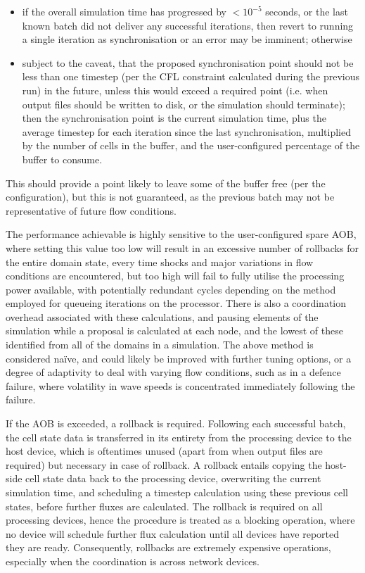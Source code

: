 \begin{itemize}
\item if the overall simulation time has progressed by $< 10^{-5}$ seconds, or the last known batch did not deliver any successful iterations, then revert to running a single iteration as synchronisation or an error may be imminent; otherwise
\item subject to the caveat, that the proposed synchronisation point should not be less than one timestep (per the CFL constraint calculated during the previous run) in the future, unless this would exceed a required point (i.e. when output files should be written to disk, or the simulation should terminate); then the synchronisation point is the current simulation time, plus the average timestep for each iteration since the last synchronisation, multiplied by the number of cells in the buffer, and the user-configured percentage of the buffer to consume.
\end{itemize}
This should provide a point likely to leave some of the buffer free (per the configuration), but this is not guaranteed, as the previous batch may not be representative of future flow conditions.

The performance achievable is highly sensitive to the user-configured spare AOB, where setting this value too low will result in an excessive number of rollbacks for the entire domain state, every time shocks and major variations in flow conditions are encountered, but too high will fail to fully utilise the processing power available, with potentially redundant cycles depending on the method employed for queueing iterations on the processor. There is also a coordination overhead associated with these calculations, and pausing elements of the simulation while a proposal is calculated at each node, and the lowest of these identified from all of the domains in a simulation. The above method is considered na\"ive, and could likely be improved with further tuning options, or a degree of adaptivity to deal with varying flow conditions, such as in a defence failure, where volatility in wave speeds is concentrated immediately following the failure.

If the AOB is exceeded, a rollback is required. Following each successful batch, the cell state data is transferred in its entirety from the processing device to the host device, which is oftentimes unused (apart from when output files are required) but necessary in case of rollback. A rollback entails copying the host-side cell state data back to the processing device, overwriting the current simulation time, and scheduling a timestep calculation using these previous cell states, before further fluxes are calculated. The rollback is required on all processing devices, hence the procedure is treated as a blocking operation, where no device will schedule further flux calculation until all devices have reported they are ready. Consequently, rollbacks are extremely expensive operations, especially when the coordination is across network devices.

